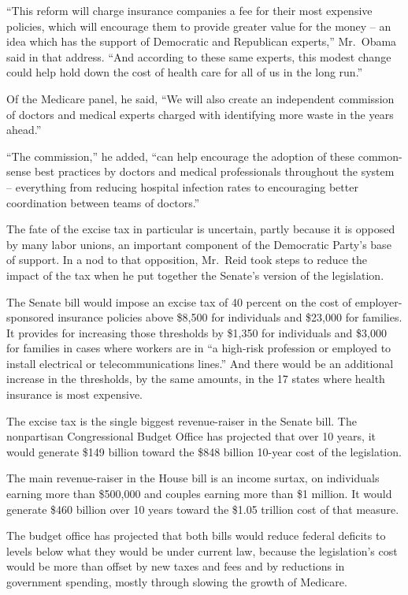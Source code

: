 ﻿\documentclass[12pt]{article}
\begin{document}
``This reform will charge insurance companies a fee for their most expensive policies, which will
encourage them to provide greater value for the money -- an idea which has the support of Democratic
and Republican experts,'' Mr.~Obama said in that address. ``And according to these same experts,
this modest change could help hold down the cost of health care for all of us in the long run.''

Of the Medicare panel, he said, ``We will also create an independent commission of doctors and
medical experts charged with identifying more waste in the years ahead.''

``The commission,'' he added, ``can help encourage the adoption of these common-sense best practices
by doctors and medical professionals throughout the system -- everything from reducing hospital
infection rates to encouraging better coordination between teams of doctors.''

The fate of the excise tax in particular is uncertain, partly because it is opposed by many labor
unions, an important component of the Democratic Party's base of support. In a nod to that
opposition, Mr.~Reid took steps to reduce the impact of the tax when he put together the Senate's
version of the legislation.

The Senate bill would impose an excise tax of 40 percent on the cost of employer-sponsored insurance
policies above \$8,500 for individuals and \$23,000 for families. It provides for increasing those
thresholds by \$1,350 for individuals and \$3,000 for families in cases where workers are in ``a
high-risk profession or employed to install electrical or telecommunications lines.'' And there
would be an additional increase in the thresholds, by the same amounts, in the 17 states where
health insurance is most expensive.

The excise tax is the single biggest revenue-raiser in the Senate bill. The nonpartisan
Congressional Budget Office has projected that over 10 years, it would generate \$149 billion toward
the \$848 billion 10-year cost of the legislation.

The main revenue-raiser in the House bill is an income surtax, on individuals earning more than
\$500,000 and couples earning more than \$1 million. It would generate \$460 billion over 10 years
toward the \$1.05 trillion cost of that measure.

The budget office has projected that both bills would reduce federal deficits to levels below what
they would be under current law, because the legislation's cost would be more than offset by new
taxes and fees and by reductions in government spending, mostly through slowing the growth of
Medicare.
\end{document}
